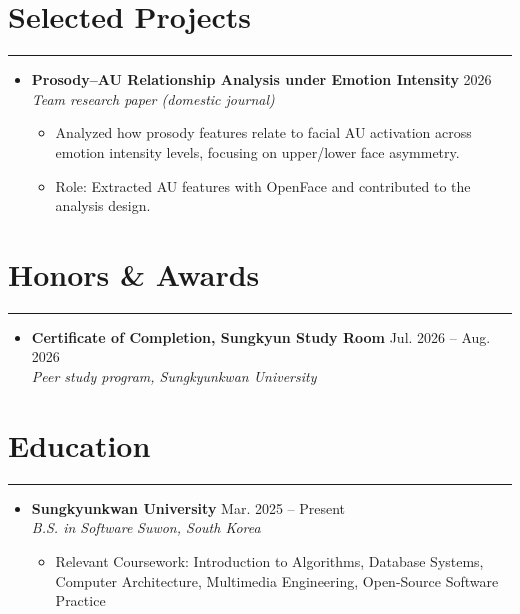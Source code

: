 \documentclass[letterpaper, 10pt]{article}
\begin{document}
\section*{Selected Projects} 
\hrule 
\vspace{4pt} 
\begin{itemize}
    \item[]
        \textbf{Prosody--AU Relationship Analysis under Emotion Intensity} \hfill 2026 \\
        \textit{Team research paper (domestic journal)}
        \begin{itemize}
           \item Analyzed how prosody features relate to facial AU activation across emotion intensity levels, focusing on upper/lower face asymmetry.
           \item Role: Extracted AU features with OpenFace and contributed to the analysis design.
       \end{itemize}
\end{itemize}
\section*{Honors \& Awards} 
\hrule 
\vspace{4pt}
\begin{itemize}
    \item[]
        \textbf{Certificate of Completion, Sungkyun Study Room} \hfill Jul. 2026 -- Aug. 2026 \\
        \textit{Peer study program, Sungkyunkwan University}
\end{itemize}
\section*{Education} 
\hrule 
\vspace{4pt} 
\begin{itemize}
    \item[]
        \textbf{Sungkyunkwan University} \hfill Mar. 2025 -- Present \\
        \textit{B.S. in Software} \hfill \textit{Suwon, South Korea}
        \begin{itemize}
            \item Relevant Coursework: Introduction to Algorithms, Database Systems, Computer Architecture, Multimedia Engineering, Open-Source Software Practice
        \end{itemize}
\end{itemize}
\end{document}
